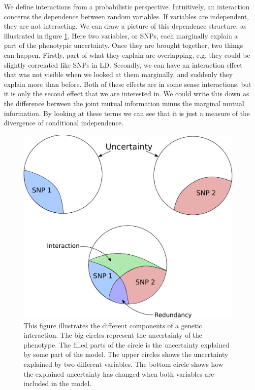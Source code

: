 \documentclass{bioinfo}
\begin{document}
We define interactions from a probabilistic perspective. Intuitively, an interaction concerns the dependence between random variables. If variables are independent, they are not interacting. We can draw a picture of this dependence structure, as illustrated in figure \ref{fig:01}. Here two variables, or SNPs, each marginally explain a part of the phenotypic uncertainty. Once they are brought together, two things can happen. Firstly, part of what they explain are overlapping, e.g. they could be slightly correlated like SNPs in LD. Secondly, we can have an interaction effect that was not visible when we looked at them marginally, and suddenly they explain more than before. Both of these effects are in some sense interactions, but it is only the second effect that we are interested in. We could write this down as the difference between the joint mutual information minus the marginal mutual information. By looking at these terms we can see that it is just a measure of the divergence of conditional independence.

\begin{figure}[!tpb]%
\centerline{\includegraphics[scale=0.3]{figures/interaction}}
\caption{This figure illustrates the different components of a genetic interaction. The big circles represent the uncertainty of the phenotype. The filled parts of the circle is the uncertainty explained by some part of the model. The upper circles shows the uncertainty explained by two different variables. The bottom circle shows how the explained uncertainty has changed when both variables are included in the model.}\label{fig:01}
\end{figure}
\end{document}
